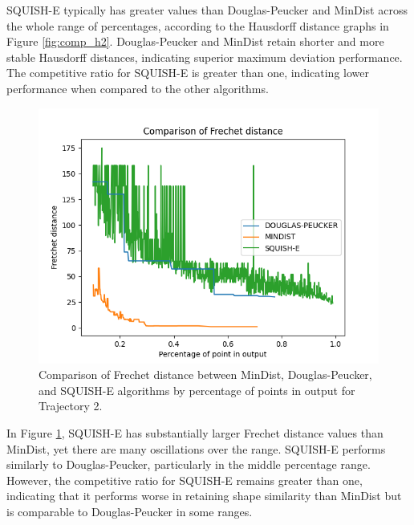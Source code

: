 SQUISH-E typically has greater values than Douglas-Peucker and MinDist across the whole range of percentages, according to the Hausdorff distance graphs in Figure \ref{fig:comp_h2}. Douglas-Peucker and MinDist retain shorter and more stable Hausdorff distances, indicating superior maximum deviation performance. The competitive ratio for SQUISH-E is greater than one, indicating lower performance when compared to the other algorithms. \\

\begin{figure}
	\centering
	\includegraphics[width=0.9\linewidth]{figures/Stats/fretchet_comp2.png}
	\caption{Comparison of Frechet distance between MinDist, Douglas-Peucker, and SQUISH-E algorithms by percentage of points in output  for Trajectory 2.}
	\label{fig:comp_f2}
\end{figure}

In Figure \ref{fig:comp_f2}, SQUISH-E has substantially larger Frechet distance values than MinDist, yet there are many oscillations over the range. SQUISH-E performs similarly to Douglas-Peucker, particularly in the middle percentage range. However, the competitive ratio for SQUISH-E remains greater than one, indicating that it performs worse in retaining shape similarity than MinDist but is comparable to Douglas-Peucker in some ranges. \\

